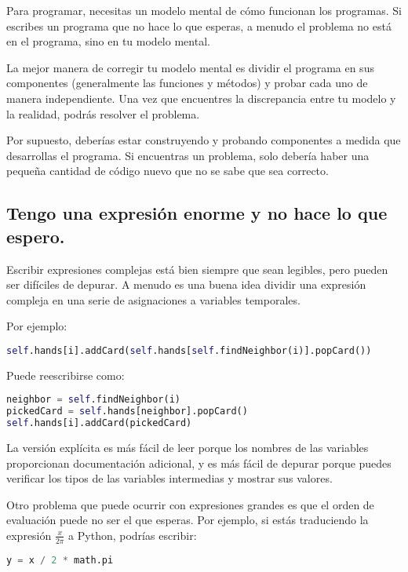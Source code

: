Para programar, necesitas un modelo mental de cómo funcionan los programas. Si escribes un programa que no hace lo que esperas, a menudo el problema no está en el programa, sino en tu modelo mental.

La mejor manera de corregir tu modelo mental es dividir el programa en sus componentes (generalmente las funciones y métodos) y probar cada uno de manera independiente. Una vez que encuentres la discrepancia entre tu modelo y la realidad, podrás resolver el problema.

Por supuesto, deberías estar construyendo y probando componentes a medida que desarrollas el programa. Si encuentras un problema, solo debería haber una pequeña cantidad de código nuevo que no se sabe que sea correcto.

\subsection{Tengo una expresión enorme y no hace lo que espero.}

Escribir expresiones complejas está bien siempre que sean legibles, pero pueden ser difíciles de depurar. A menudo es una buena idea dividir una expresión compleja en una serie de asignaciones a variables temporales.

Por ejemplo:

\begin{lstlisting}[language=Python]
self.hands[i].addCard(self.hands[self.findNeighbor(i)].popCard())
\end{lstlisting}

Puede reescribirse como:

\begin{lstlisting}[language=Python]
neighbor = self.findNeighbor(i)
pickedCard = self.hands[neighbor].popCard()
self.hands[i].addCard(pickedCard)
\end{lstlisting}

La versión explícita es más fácil de leer porque los nombres de las variables proporcionan documentación adicional, y es más fácil de depurar porque puedes verificar los tipos de las variables intermedias y mostrar sus valores.

Otro problema que puede ocurrir con expresiones grandes es que el orden de evaluación puede no ser el que esperas. Por ejemplo, si estás traduciendo la expresión $\frac{x}{2\pi}$ a Python, podrías escribir:

\begin{lstlisting}[language=Python]
y = x / 2 * math.pi
\end{lstlisting}


